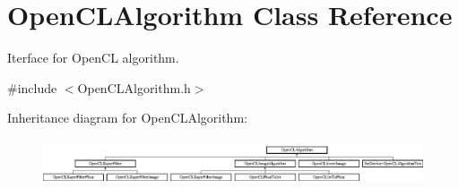 \hypertarget{class_open_c_l_algorithm}{\section{Open\-C\-L\-Algorithm Class Reference}
\label{class_open_c_l_algorithm}
}


Iterface for Open\-C\-L algorithm.  




{\ttfamily \#include $<$Open\-C\-L\-Algorithm.\-h$>$}

Inheritance diagram for Open\-C\-L\-Algorithm\-:\begin{figure}[H]
\begin{center}
\leavevmode
\includegraphics[height=1.352657cm]{class_open_c_l_algorithm}
\end{center}
\end{figure}
